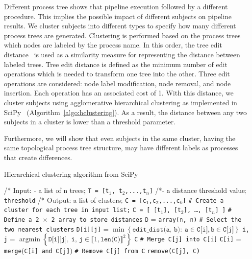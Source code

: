 \documentclass[a4paper,num-refs]{oup-contemporary}
\DeclareMathOperator*{\argmin}{argmin}
\begin{document}
Different process tree shows that pipeline execution followed by a different procedure. 
This implies the possible impact of different subjects on pipeline results.
We cluster subjects into different types to specify how many different 
process trees are generated. Clustering is performed based on the process trees 
which nodes are labeled by the process name. 
In this order, 
the tree edit distance~\cite{zhang1989simple} is used as a similarity measure for 
representing the distance between labeled trees. Tree edit distance  is defined  
as the minimum number of edit operations which is needed to transform one tree into 
the other. Three edit operations are considered: node label modification, 
node removal, and node insertion. Each operation has an associated cost of 1.
With this distance, we cluster subjects using agglomerative hierarchical
clustering as implemented in SciPy~\cite{oliphant2007scipy}
(Algorithm~\ref{algo:hclustering}). As a result, the distance between
any two subjects in a cluster is lower than a threshold parameter.

Furthermore, we will show that even subjects in the same cluster, 
having the same topological process tree structure, 
may have different labels as processes that create differences.

\begin{algorithm}[h!]
\caption{Hierarchical clustering algorithm from SciPy}
\label{algo:hclustering}
\begin{algorithmic}

  \State /* Input: - a list of n trees; \texttt{T = [t${_1}$, t${_2}$,...,t${_n}$]}
  \State /*\quad \quad \quad \quad - a distance threshold value; \texttt{threshold}
  \State /* Output: a list of clusters; \texttt{C = [c${_1}$,c${_2}$,...,c${_k}$]}
  \State \texttt{\# Create a cluster for each tree in input list;}
  \State \texttt{C = [ [t${_1}$], [t${_2}$], \ldots , [t${_n}$] ]}
  \State \texttt{\# Define a 2 $\times$ 2 array to store distances}
  \State \texttt{D} = \texttt{array(n, n)}
  \State \texttt{\# Select the two nearest clusters}
  \State \texttt{D[i][j]} = $\min \left\{ \texttt{edit\_dist(a, b)}: \ \texttt{a} \in \texttt{C[i]}, \texttt{b} \in \texttt{C[j]} \right\}$
    \EndFor
  \EndFor
  \State \texttt{i, j} = $\argmin \left\{ \texttt{D[i][j]}, \ \texttt{i, j} \in \llbracket 1, \texttt{len(C)}\rrbracket^2 \right\}$
  \State \Return \texttt{C}
  \Else
  \State \texttt{\# Merge C[j] into C[i]}
  \State \texttt{C[i]} = \texttt{merge}(\texttt{C[i] and C[j]})
  \State \texttt{\# Remove C[j] from C}
  \State \texttt{remove(C[j], C)}
  \EndIf
  \EndWhile
\end{algorithmic}
\end{algorithm}
\end{document}
